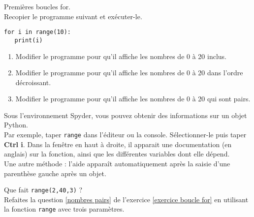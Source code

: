 \begin{exercice}\label{exercice boucle for} Premi\` eres boucles for.\\ 
Recopier le programme suivant et ex\' ecuter-le.
\begin{verbatim}
for i in range(10):
   print(i)
\end{verbatim}
\begin{enumerate}
\item Modifier le programme pour qu'il affiche les nombres de 0 \` a 20 inclus.
\item Modifier le programme pour qu'il affiche les nombres de 0 \` a 20 dans l'ordre d\' ecroissant.
\item \label{nombres pairs} Modifier le programme pour qu'il affiche les nombres de 0 \` a 20 qui sont pairs. 
\end{enumerate} 
\end{exercice}
\bigskip

\begin{remark}
Sous l'environnement Spyder, vous pouvez obtenir des informations sur un objet Python. \\
Par exemple, taper \verb?range? dans l'\' editeur ou la console. S\' electionner-le puis taper \textbf{Ctrl i}. Dans la fen\^ etre en haut \`  a droite, il apparait une documentation (en anglais) sur la fonction, ainsi que les diff\' erentes variables dont elle d\' epend.\\
Une autre m\' ethode : l'aide appara\^ it automatiquement apr\` es la saisie d'une parenth\` ese gauche apr\` es un objet.
\end{remark}


\begin{exercice}
Que fait \verb?range(2,40,3)? ?\\
Refaites la question \ref{nombres pairs} de l'exercice \ref{exercice boucle for} en utilisant la fonction \verb?range? avec trois param\` etres.
\end{exercice}
\bigskip



